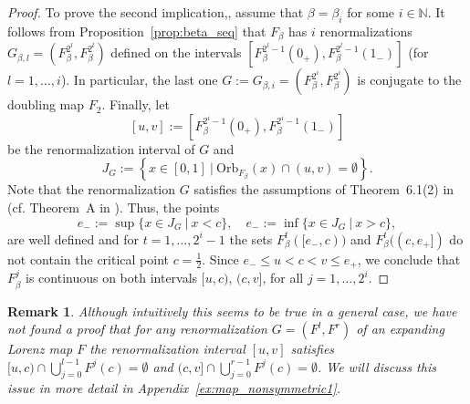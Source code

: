 \documentclass[10pt,reqno]{amsart}
\theoremstyle{plain}
\theoremstyle{assumption}
\theoremstyle{notation}
\theoremstyle{claim}
\theoremstyle{conj}
\newtheorem{remark}{\textbf{Remark}}[section]
\theoremstyle{theorem}
\theoremstyle{proposition}
\theoremstyle{corollary}
\begin{document}
\begin{proof}
    To prove the second implication,, assume that $\beta=\beta_i$ for some $i\in\mathbb{N}$. It follows from Proposition~\ref{prop:beta_seq} that $F_{\beta}$ has $i$ renormalizations $G_{\beta,l}=(F^{2^l}_{\beta},F^{2^l}_{\beta})$ defined on the intervals $[F^{2^l-1}_{\beta}(0_+),F^{2^l-1}_{\beta}(1_-)]$ (for $l=1,\ldots,i$). In particular, the last one $G:=G_{\beta,i}=(F^{2^i}_{\beta},F^{2^i}_{\beta})$ is conjugate to the doubling map $F_2$. Finally, let 
    $$
    [u,v]:=[F^{2^i-1}_{\beta}(0_+),F^{2^i-1}_{\beta}(1_-)]
    $$ 
    be the renormalization interval of $G$ and 
    $$
    J_G:=\left\lbrace x\in [0,1]\:|\: \text{Orb}_{F_{\beta}}(x)\cap \left(u, v\right) =\emptyset\right\rbrace .
    $$
    Note that the renormalization $G$ satisfies the assumptions of Theorem~6.1(2) in \cite{ChO} (cf. Theorem~A in \cite{Ding}). Thus, the points
    $$
    e_-:=\sup\{x\in J_G\:|\: x<c\},\quad e_-:=\inf\{x\in J_G\:|\: x>c\},
    $$
    are well defined and for $t=1,\ldots,2^i-1$ the sets $F_{\beta}^t([e_-,c))$ and $F_{\beta}^t((c,e_+])$ do not contain the critical point $c=\frac{1}{2}$. Since $e_-\leq u<c<v\leq e_+$, we conclude that $F_{\beta}^j$ is continuous on both intervals $[u,c)$, $(c,v]$, for all $j=1,\ldots,2^i$.   
\end{proof}
\begin{remark}
    Although intuitively this seems to be true in a general case, we have not found a proof that for any renormalization $G=(F^l,F^r)$ of an expanding Lorenz map $F$ the renormalization interval $[u,v]$ satisfies $[u,c)\cap\bigcup_{j=0}^{l-1}F^j(c)=\emptyset$ and $(c,v]\cap\bigcup_{j=0}^{r-1}F^j(c)=\emptyset$. We will discuss this issue in more detail in Appendix~\ref{ex:map_nonsymmetric1}.
\end{remark}
\end{document}
